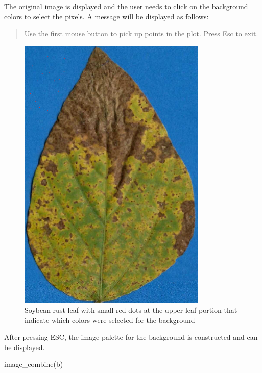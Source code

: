 \documentclass[
  letterpaper,
]{book}
\newenvironment{Shaded}{\begin{snugshade}}{\end{snugshade}}
\newcommand{\FunctionTok}[1]{\textcolor[rgb]{0.28,0.35,0.67}{#1}}
\newcommand{\NormalTok}[1]{\textcolor[rgb]{0.00,0.23,0.31}{#1}}
\begin{document}
The original image is displayed and the user needs to click on the
background colors to select the pixels. A message will be displayed as
follows:

\begin{quote}
Use the first mouse button to pick up points in the plot. Press Esc to
exit.
\end{quote}

\begin{figure}

{\centering \includegraphics[width=3.53125in,height=\textheight]{imgs/sbr_pick_palette.png}

}

\caption{Soybean rust leaf with small red dots at the upper leaf portion
that indicate which colors were selected for the background}

\end{figure}

After pressing ESC, the image palette for the background is constructed
and can be displayed.

\begin{Shaded}
\begin{Highlighting}[]
\FunctionTok{image\_combine}\NormalTok{(b)}
\end{Highlighting}
\end{Shaded}
\end{document}

